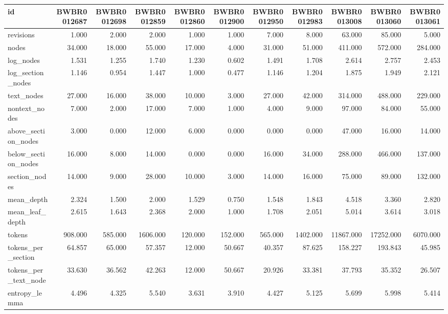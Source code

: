 \begin{tabular}{lrrrrrrrrrr}
\toprule
id & BWBR0012687 & BWBR0012698 & BWBR0012859 & BWBR0012860 & BWBR0012900 & BWBR0012950 & BWBR0012983 & BWBR0013008 & BWBR0013060 & BWBR0013061 \\
\midrule
revisions & 1.000 & 2.000 & 2.000 & 1.000 & 1.000 & 7.000 & 8.000 & 63.000 & 85.000 & 5.000 \\
\cline{1-11}
nodes & 34.000 & 18.000 & 55.000 & 17.000 & 4.000 & 31.000 & 51.000 & 411.000 & 572.000 & 284.000 \\
\cline{1-11}
log\_nodes & 1.531 & 1.255 & 1.740 & 1.230 & 0.602 & 1.491 & 1.708 & 2.614 & 2.757 & 2.453 \\
\cline{1-11}
log\_section\_nodes & 1.146 & 0.954 & 1.447 & 1.000 & 0.477 & 1.146 & 1.204 & 1.875 & 1.949 & 2.121 \\
\cline{1-11}
text\_nodes & 27.000 & 16.000 & 38.000 & 10.000 & 3.000 & 27.000 & 42.000 & 314.000 & 488.000 & 229.000 \\
\cline{1-11}
nontext\_nodes & 7.000 & 2.000 & 17.000 & 7.000 & 1.000 & 4.000 & 9.000 & 97.000 & 84.000 & 55.000 \\
\cline{1-11}
above\_section\_nodes & 3.000 & 0.000 & 12.000 & 6.000 & 0.000 & 0.000 & 0.000 & 47.000 & 16.000 & 14.000 \\
\cline{1-11}
below\_section\_nodes & 16.000 & 8.000 & 14.000 & 0.000 & 0.000 & 16.000 & 34.000 & 288.000 & 466.000 & 137.000 \\
\cline{1-11}
section\_nodes & 14.000 & 9.000 & 28.000 & 10.000 & 3.000 & 14.000 & 16.000 & 75.000 & 89.000 & 132.000 \\
\cline{1-11}
mean\_depth & 2.324 & 1.500 & 2.000 & 1.529 & 0.750 & 1.548 & 1.843 & 4.518 & 3.360 & 2.820 \\
\cline{1-11}
mean\_leaf\_depth & 2.615 & 1.643 & 2.368 & 2.000 & 1.000 & 1.708 & 2.051 & 5.014 & 3.614 & 3.018 \\
\cline{1-11}
tokens & 908.000 & 585.000 & 1606.000 & 120.000 & 152.000 & 565.000 & 1402.000 & 11867.000 & 17252.000 & 6070.000 \\
\cline{1-11}
tokens\_per\_section & 64.857 & 65.000 & 57.357 & 12.000 & 50.667 & 40.357 & 87.625 & 158.227 & 193.843 & 45.985 \\
\cline{1-11}
tokens\_per\_text\_node & 33.630 & 36.562 & 42.263 & 12.000 & 50.667 & 20.926 & 33.381 & 37.793 & 35.352 & 26.507 \\
\cline{1-11}
entropy\_lemma & 4.496 & 4.325 & 5.540 & 3.631 & 3.910 & 4.427 & 5.125 & 5.699 & 5.998 & 5.414 \\

\end{tabular}
